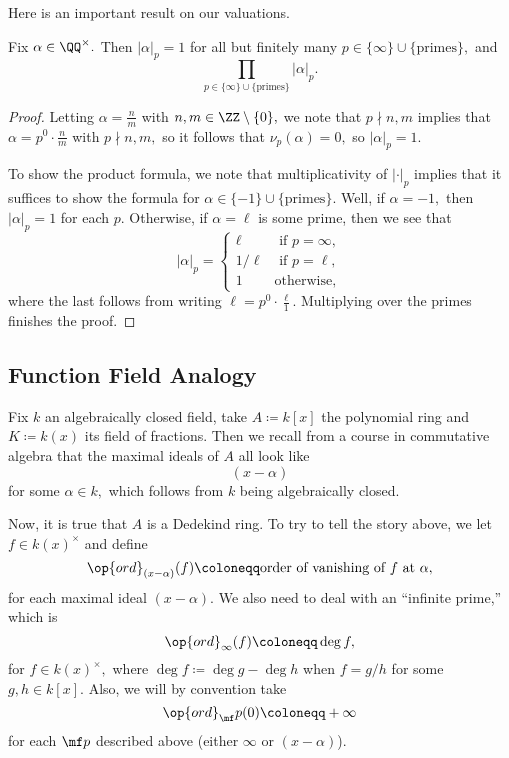 \documentclass[../notes.tex]{subfiles}
\begin{document}
Here is an important result on our valuations.
\begin{theorem}
	Fix $\alpha\in\QQ^\times.$ Then $|\alpha|_p=1$ for all but finitely many $p\in\{\infty\}\cup\{\text{primes}\},$ and
	\[\prod_{p\in\{\infty\}\cup\{\text{primes}\}}|\alpha|_p.\]
\end{theorem}
\begin{proof}
	Letting $\alpha=\frac nm$ with $n,m\in\ZZ\setminus\{0\},$ we note that $p\nmid n,m$ implies that $\alpha=p^0\cdot\frac nm$ with $p\nmid n,m,$ so it follows that $\nu_p(\alpha)=0,$ so $|\alpha|_p=1.$

	To show the product formula, we note that multiplicativity of $|\cdot|_p$ implies that it suffices to show the formula for $\alpha\in\{-1\}\cup\{\text{primes}\}.$ Well, if $\alpha=-1,$ then $|\alpha|_p=1$ for each $p.$ Otherwise, if $\alpha=\ell$ is some prime, then we see that
	\[|\alpha|_p=\begin{cases}
		\ell & \text{ if }p=\infty, \\
		1/\ell & \text{ if }p=\ell, \\
		1 & \text{otherwise},
	\end{cases}\]
	where the last follows from writing $\ell=p^0\cdot\frac\ell1.$ Multiplying over the primes finishes the proof.
\end{proof}

\subsection{Function Field Analogy}
Fix $k$ an algebraically closed field, take $A\coloneqq k[x]$ the polynomial ring and $K\coloneqq k(x)$ its field of fractions. Then we recall from a course in commutative algebra that the maximal ideals of $A$ all look like
\[(x-\alpha)\]
for some $\alpha\in k,$ which follows from $k$ being algebraically closed.

Now, it is true that $A$ is a Dedekind ring. To try to tell the story above, we let $f\in k(x)^\times$ and define
\[\op{ord}_{(x-\alpha)}(f)\coloneqq \text{order of vanishing of }f\text{ at }\alpha,\]
for each maximal ideal $(x-\alpha).$ We also need to deal with an ``infinite prime,'' which is
\[\op{ord}_\infty(f)\coloneqq \deg f,\]
for $f\in k(x)^\times,$ where $\deg f\coloneqq \deg g-\deg h$ when $f=g/h$ for some $g,h\in k[x].$ Also, we will by convention take
\[\op{ord}_\mf p(0)\coloneqq +\infty\]
for each $\mf p$ described above (either $\infty$ or $(x-\alpha)$).
\end{document}
